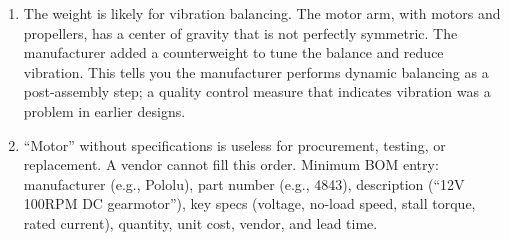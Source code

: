 \begin{enumerate}[leftmargin=1.5em]
\item The weight is likely for vibration balancing. The motor arm, with motors and propellers, has a center of gravity that is not perfectly symmetric. The manufacturer added a counterweight to tune the balance and reduce vibration. This tells you the manufacturer performs dynamic balancing as a post-assembly step; a quality control measure that indicates vibration was a problem in earlier designs.

\item ``Motor'' without specifications is useless for procurement, testing, or replacement. A vendor cannot fill this order. Minimum BOM entry: manufacturer (e.g., Pololu), part number (e.g., 4843), description (``12V 100RPM DC gearmotor''), key specs (voltage, no-load speed, stall torque, rated current), quantity, unit cost, vendor, and lead time.
\end{enumerate}


